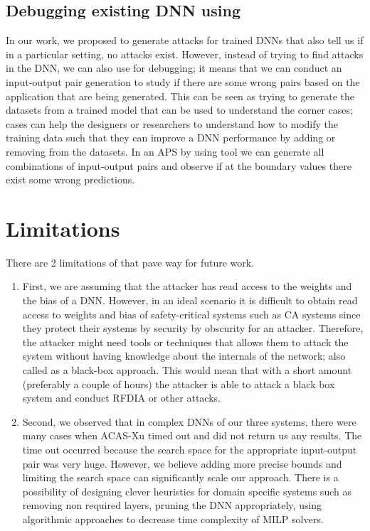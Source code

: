 \subsection{Debugging existing DNN using \tool}
In our work, we proposed \tool to generate attacks for trained \ac{DNN}s that also tell us if in a particular setting, no attacks exist. 
However, instead of trying to find attacks in the \ac{DNN}, we can also use \tool for debugging; it means that we can conduct an input-output pair generation to study if there are some wrong pairs based on the application that are being generated. 
This can be seen as trying to generate the datasets from a trained model that can be used to understand the corner cases; cases can help the designers or researchers to understand how to modify the training data such that they can improve a \ac{DNN} performance by adding or removing from the datasets.
In an \ac{APS} by using \ac{tool} we can generate all combinations of input-output pairs and observe if at the boundary values there exist some wrong predictions. 





\section{ Limitations}

There are 2 limitations of \tool that pave way for future work. 
\begin{enumerate}
	\item First, we are assuming that the attacker has read access to the weights and the bias of a \ac{DNN}.
	However, in an ideal scenario it is difficult to obtain read access to weights and bias of safety-critical systems such as \ac{CA} systems since they protect their systems by security by obscurity for an attacker. 
	Therefore, the attacker might need tools or techniques that allows them to attack the system without having knowledge about the internals of the network; also called as a black-box approach. 
	This would mean that with a short amount (preferably a couple of hours) the attacker is able to attack a black box system and conduct \ac{RFDIA} or other attacks. 
	\item Second, we observed that in complex \ac{DNN}s of our three systems, there were many cases when  \ac{ACAS-Xu} timed out and did not return us any results. 
	The time out occurred because the search space for the appropriate input-output pair was very huge. 
	However, we believe adding more precise bounds and limiting the search space can significantly scale our approach. 
	There is a possibility of designing clever heuristics for domain specific systems such as removing non required layers, pruning the \ac{DNN} appropriately, using algorithmic approaches to decrease time complexity of \ac{MILP} solvers. 
	
	\label{section:limitations}
	
\end{enumerate}

